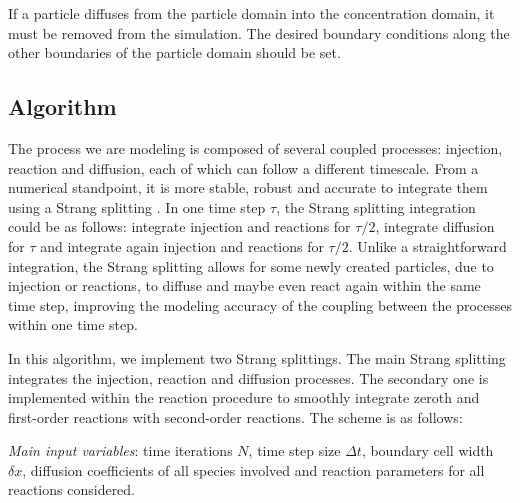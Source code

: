 \documentclass[10pt,twocolumn]{revtex4-1}
\begin{document}
	If a particle diffuses from the particle domain into the concentration domain, it must be removed from the simulation. The desired boundary conditions along the other boundaries of the particle domain should be set.
	
	
	\subsection{Algorithm}
	\label{sec:algorithm}
	The process we are modeling is composed of several coupled processes: injection, reaction and diffusion, each of which can follow a different timescale. From a numerical standpoint, it is more stable, robust and accurate to integrate them using a Strang splitting \cite{del2018grand, strangsplitting}. In one time step $\tau$, the Strang splitting integration could be as follows: integrate injection and reactions for $\tau/2$, integrate diffusion for $\tau$ and integrate again injection and reactions for $\tau/2$. Unlike a straightforward integration, the Strang splitting allows for some newly created particles, due to injection or reactions, to diffuse and maybe even react again within the same time step, improving the modeling accuracy of the coupling between the processes within one time step. 
	
	In this algorithm, we implement two Strang splittings. The main Strang splitting integrates the injection, reaction and diffusion processes. The secondary one is implemented within the reaction procedure to smoothly integrate zeroth and first-order reactions with second-order reactions. The scheme is as follows: 
	
	\textit{Main input variables}: time iterations $N$, time step size $\Delta t$, boundary cell width $\delta x$, diffusion coefficients of all species involved and reaction parameters for all reactions considered.
	
\end{document}

